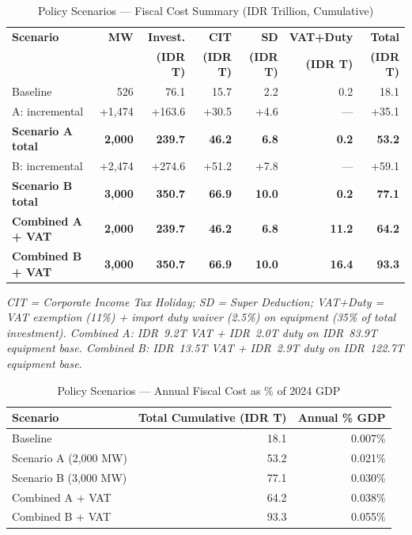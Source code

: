 \documentclass[11pt,a4paper]{article}
\begin{document}
\begin{table}[H]
\centering
\caption{Policy Scenarios --- Fiscal Cost Summary (IDR Trillion, Cumulative)}
\small
\begin{tabular}{p{4.2cm}rrrrrr}
\toprule
\textbf{Scenario} & \textbf{MW} & \textbf{Invest.} & \textbf{CIT} & \textbf{SD} & \textbf{VAT+Duty} & \textbf{Total} \\
 & & \textbf{(IDR T)} & \textbf{(IDR T)} & \textbf{(IDR T)} & \textbf{(IDR T)} & \textbf{(IDR T)} \\
\midrule
Baseline                 & 526   & 76.1  & 15.7 & 2.2 & 0.2  & 18.1 \\
\quad A: incremental     & +1,474 & +163.6 & +30.5 & +4.6 & --- & +35.1 \\
\textbf{Scenario A total}& \textbf{2,000} & \textbf{239.7} & \textbf{46.2} & \textbf{6.8} & \textbf{0.2} & \textbf{53.2} \\
\quad B: incremental     & +2,474 & +274.6 & +51.2 & +7.8 & --- & +59.1 \\
\textbf{Scenario B total}& \textbf{3,000} & \textbf{350.7} & \textbf{66.9} & \textbf{10.0} & \textbf{0.2} & \textbf{77.1} \\
\textbf{Combined A + VAT}& \textbf{2,000} & \textbf{239.7} & \textbf{46.2} & \textbf{6.8} & \textbf{11.2} & \textbf{64.2} \\
\textbf{Combined B + VAT}& \textbf{3,000} & \textbf{350.7} & \textbf{66.9} & \textbf{10.0} & \textbf{16.4} & \textbf{93.3} \\
\bottomrule
\end{tabular}
\end{table}

\noindent\textit{CIT = Corporate Income Tax Holiday; SD = Super Deduction; VAT+Duty = VAT exemption (11\%) + import duty waiver (2.5\%) on equipment (35\% of total investment). Combined A: IDR~9.2T VAT + IDR~2.0T duty on IDR~83.9T equipment base. Combined B: IDR~13.5T VAT + IDR~2.9T duty on IDR~122.7T equipment base.}

\begin{table}[H]
\centering
\caption{Policy Scenarios --- Annual Fiscal Cost as \% of 2024 GDP}
\begin{tabular}{lrr}
\toprule
\textbf{Scenario} & \textbf{Total Cumulative (IDR T)} & \textbf{Annual \% GDP} \\
\midrule
Baseline                 & 18.1 & 0.007\% \\
Scenario A (2,000 MW)    & 53.2 & 0.021\% \\
Scenario B (3,000 MW)    & 77.1 & 0.030\% \\
Combined A + VAT         & 64.2 & 0.038\% \\
Combined B + VAT         & 93.3 & 0.055\% \\
\bottomrule
\end{tabular}
\end{table}
\end{document}
